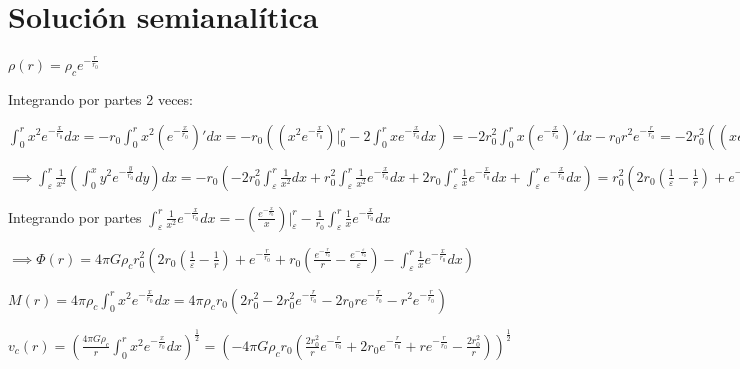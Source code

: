 \documentclass[12pt]{book}
\begin{document}
\clearpage

\section*{Solución semianalítica}
\begin{description}

\item  $\rho(r) =  \rho_c  e^{-\frac{r}{r_0}} $  
\item Integrando por partes 2 veces:
\item $\int_0^r{x^2 e^{-\frac{x}{r_0}}dx} = - r_0 \int_0^r{x^2 (e^{-\frac{x}{r_0}})\prime dx}
=-r_0( (x^2 e^{-\frac{x}{r_0}})\Big|_0^r  - 2\int_0^r{x e^{-\frac{x}{r_0}}dx})  = -2 r_0^2 \int_0^r{x (e^{-\frac{x}{r_0}})\prime dx} - r_0 r^2 e^{-\frac{r}{r_0}} = -2 r_0^2 ((x e^{-\frac{x}{r_0}})\Big|_0^r - \int_0^r{e^{-\frac{x}{r_0}}dx}) - r_0 r^2 e^{-\frac{r}{r_0}} = -2 r_0^3 e^{-\frac{x}{r_0}}\Big|_0^r -2 r_0^2 r e^{-\frac{r}{r_0}} - r_0 r^2 e^{-\frac{r}{r_0}} = 2 r_0^3 -2 r_0^3 e^{-\frac{r}{r_0}} -2 r_0^2 r e^{-\frac{r}{r_0}} - r_0 r^2 e^{-\frac{r}{r_0}}  $

\item $\implies \int_\varepsilon^r{ \frac{1}{x^2}(\int_0^x{y^2 e^{-\frac{y}{r_0}}dy})dx} = 
-r_0 (-2 r_0^2 \int_\varepsilon^r{\frac{1}{x^2}dx} + r_0^2 \int_\varepsilon^r{\frac{1}{x^2}e^{-\frac{x}{r_0}}dx}  + 2 r_0 \int_\varepsilon^r{\frac{1}{x} e^{-\frac{x}{r_0}}dx} + \int_\varepsilon^r{e^{-\frac{x}{r_0}}dx} ) = 
r_0^2 (2 r_0 (\frac{1}{\varepsilon} - \frac{1}{r})  + e^{-\frac{r}{r_0}} - r_0 \int_\varepsilon^r{\frac{1}{x^2}e^{-\frac{x}{r_0}}dx} - 2\int_\varepsilon^r{\frac{1}{x} e^{-\frac{x}{r_0}}dx} ) $
\item Integrando por partes $\int_\varepsilon^r{\frac{1}{x^2}e^{-\frac{x}{r_0}}dx} = -(\frac{e^{-\frac{x}{r_0}}}{x})\Big|_\varepsilon^r - \frac{1}{r_0} \int_\varepsilon^r{\frac{1}{x} e ^{-\frac{x}{r_0}}dx}  $

\item $\implies \Phi(r) = 4 \pi G \rho_c r_0^2 (2 r_0 (\frac{1}{\varepsilon} - \frac{1}{r}) + e^{-\frac{r}{r_0}} + r_0 (\frac{e^{-\frac{r}{r_0}}}{r} - \frac{e^{-\frac{\varepsilon}{r_0}}}{\varepsilon} ) -\int_\varepsilon^r{\frac{1}{x} e^{-\frac{x}{r_0}}dx} ) $


\item $M(r) = 4 \pi \rho_c \int_0^r{x^2 e^{-\frac{x}{r_0}}dx} = 4 \pi \rho_c r_0 ( 2 r_0^2 - 2 r_0^2 e^{-\frac{r}{r_0}} - 2 r_0 r e^{-\frac{r}{r_0}} - r^2 e^{-\frac{r}{r_0}}) $

\item $v_c(r) = (\frac{4 \pi G \rho_c}{r}\int_0^r{x^2 e^{-\frac{x}{r_0}}dx} )^{\frac{1}{2}}   
= (-4 \pi G \rho_c r_0 (\frac{2 r_0^2}{r}e^{-\frac{r}{r_0}} + 2 r_0 e^{-\frac{r}{r_0}} + r e^{-\frac{r}{r_0}} -  \frac{2 r_0^2}{r} ))^{\frac{1}{2}} $
\end{description}
\end{document}

